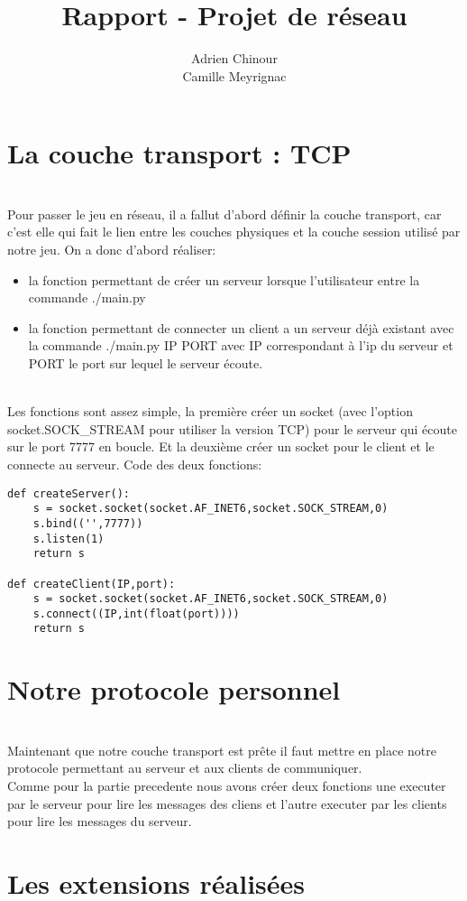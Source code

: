 \documentclass[12pt]{article}
\title{\textbf{Rapport - Projet de réseau}}
\author{Adrien Chinour\\Camille Meyrignac}
\begin{document}
\maketitle

\tableofcontents

\section{La couche transport : TCP}

\textnormal{
\\Pour passer le jeu en réseau, il a fallut d'abord définir la couche transport, car c'est elle qui fait le lien entre les couches physiques et la couche session utilisé par notre jeu. On a donc d'abord réaliser:
}

\begin{itemize}
\item la fonction permettant de créer un serveur lorsque l'utilisateur entre la commande ./main.py
\item la fonction permettant de connecter un client a un serveur déjà existant avec la commande ./main.py IP PORT avec IP correspondant à l'ip du serveur et PORT le port sur lequel le serveur écoute.
\end{itemize}
\textnormal{
\\Les fonctions sont assez simple, la première créer un socket (avec l'option socket.SOCK\_STREAM pour utiliser la version TCP) pour le serveur qui écoute sur le port 7777 en boucle.
Et la deuxième créer un socket pour le client et le connecte au serveur. Code des deux fonctions:
}

\begin{verbatim}
def createServer():
    s = socket.socket(socket.AF_INET6,socket.SOCK_STREAM,0)
    s.bind(('',7777))
    s.listen(1)
    return s

def createClient(IP,port):
    s = socket.socket(socket.AF_INET6,socket.SOCK_STREAM,0)
    s.connect((IP,int(float(port))))
    return s
\end{verbatim}

\section{Notre protocole personnel}
\textnormal{
\\ Maintenant que notre couche transport est prête il faut mettre en place notre protocole permettant au serveur et aux clients de communiquer.\\
Comme pour la partie precedente nous avons créer deux fonctions une executer par le serveur pour lire les messages des cliens et l'autre executer par les clients pour lire les messages du serveur.\\
}





\section{Les extensions réalisées}
\end{document}
